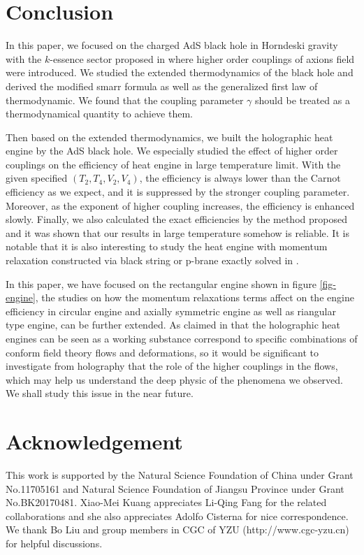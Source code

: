 \documentclass[preprint,showpacs,showkeys,onecolumn,nofootinbib]{revtex4}
\begin{document}
\section{Conclusion}\label{sec:conclusion}
In this paper, we focused on the charged AdS black hole in Horndeski gravity  with the $k$-essence sector proposed in \cite{Cisterna:2017jmv} where higher order couplings of axions field were introduced.
We studied the  extended thermodynamics of the black hole and  derived  the modified  smarr formula as well as the generalized first law of thermodynamic. We found that the coupling parameter $\gamma$ should be treated as a thermodynamical quantity to achieve them.

Then based on the extended thermodynamics, we built the holographic  heat engine by the AdS black hole. We especially studied the effect of higher order couplings  on the efficiency of heat engine in
large temperature limit. With the given specified $(T_2,T_4,V_2,V_4)$,   the efficiency is always lower than the Carnot efficiency as we expect, and it is suppressed by the stronger coupling parameter. Moreover, as the exponent of higher coupling increases, the efficiency is enhanced slowly. Finally, we also calculated the exact efficiencies by the method proposed \cite{Johnson:2016pfa} and it was shown that our results in large temperature somehow is reliable. It is notable that it is also interesting to study the heat engine with momentum relaxation constructed  via black string or p-brane exactly solved in \cite{Cisterna:2017qrb}.

In this paper, we have focused on the rectangular engine shown in figure \ref{fig-engine}, the studies on  how the momentum relaxations terms affect on the engine efficiency in circular engine  \cite{Chakraborty:2016ssb} and axially symmetric engine as  well as riangular type engine\cite{Rosso:2018acz}, can be further extended. As  claimed in \cite{Johnson:2018amj} that the holographic heat engines can be seen as a working substance correspond to specific combinations of conform field theory flows and deformations, so  it would be significant  to investigate from holography that the role of the higher couplings in the flows, which may help us understand the deep physic of the phenomena we  observed. We shall study this issue in the near future.


\section*{Acknowledgement}
This work is supported by the Natural Science Foundation of China under Grant No.11705161 and Natural Science Foundation of Jiangsu Province under Grant No.BK20170481.  Xiao-Mei Kuang appreciates  Li-Qing Fang for the related  collaborations and she also appreciates Adolfo Cisterna for nice correspondence. We thank Bo Liu and  group members in CGC of YZU (http://www.cgc-yzu.cn) for helpful discussions.
\end{document}
